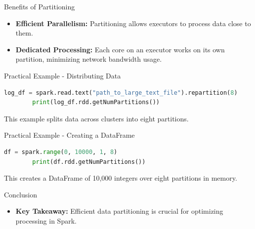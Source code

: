 \begin{frame}{Benefits of Partitioning}
    \begin{itemize}
        \item \textbf{Efficient Parallelism:} Partitioning allows executors to process data close to them.
        \item \textbf{Dedicated Processing:} Each core on an executor works on its own partition, minimizing network bandwidth usage.
    \end{itemize}
\end{frame}

\begin{frame}[fragile]{Practical Example - Distributing Data}
    \begin{lstlisting}[language=Python,label={lst:pyspark-data-partitioning}]
        log_df = spark.read.text("path_to_large_text_file").repartition(8)
        print(log_df.rdd.getNumPartitions())
    \end{lstlisting}
    This example splits data across clusters into eight partitions.
\end{frame}

\begin{frame}[fragile]{Practical Example - Creating a DataFrame}
    \begin{lstlisting}[language=Python,label={lst:pyspark-creating-dataframe}]
        df = spark.range(0, 10000, 1, 8)
        print(df.rdd.getNumPartitions())
    \end{lstlisting}
    This creates a DataFrame of 10,000 integers over eight partitions in memory.
\end{frame}

\begin{frame}{Conclusion}
    \begin{itemize}
        \item \textbf{Key Takeaway:} Efficient data partitioning is crucial for optimizing processing in Spark.
    \end{itemize}
\end{frame}


